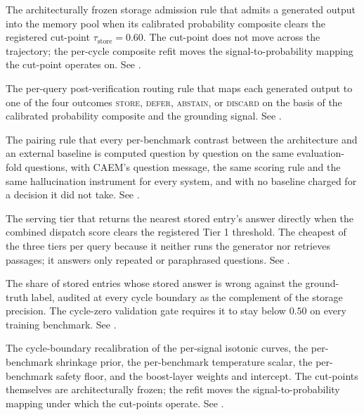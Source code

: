 \begin{description}[style=nextline, leftmargin=0pt, labelindent=0pt, itemsep=6pt, parsep=0pt, font=\bfseries, beginpenalty=10000]
\item[Fixed-threshold storage gate:] The architecturally frozen storage admission rule that admits a generated output into the memory pool when its calibrated probability composite clears the registered cut-point $\tau_{\text{store}} = 0.60$. The cut-point does not move across the trajectory; the per-cycle composite refit moves the signal-to-probability mapping the cut-point operates on. See .

\item[Four-outcome decision tree:] The per-query post-verification routing rule that maps each generated output to one of the four outcomes \textsc{store}, \textsc{defer}, \textsc{abstain}, or \textsc{discard} on the basis of the calibrated probability composite and the grounding signal. See .

\item[Matched-protocol contract:] The pairing rule that every per-benchmark contrast between the architecture and an external baseline is computed question by question on the same evaluation-fold questions, with CAEM's question message, the same scoring rule and the same hallucination instrument for every system, and with no baseline charged for a decision it did not take. See .

\item[Memory-direct tier (Tier 1):] The serving tier that returns the nearest stored entry's answer directly when the combined dispatch score clears the registered Tier 1 threshold. The cheapest of the three tiers per query because it neither runs the generator nor retrieves passages; it answers only repeated or paraphrased questions. See .

\item[Memory-poisoning rate:] The share of stored entries whose stored answer is wrong against the ground-truth label, audited at every cycle boundary as the complement of the storage precision. The cycle-zero validation gate requires it to stay below $0.50$ on every training benchmark. See .

\item[Per-cycle composite refit:] The cycle-boundary recalibration of the per-signal isotonic curves, the per-benchmark shrinkage prior, the per-benchmark temperature scalar, the per-benchmark safety floor, and the boost-layer weights and intercept. The cut-points themselves are architecturally frozen; the refit moves the signal-to-probability mapping under which the cut-points operate. See .


\end{description}
